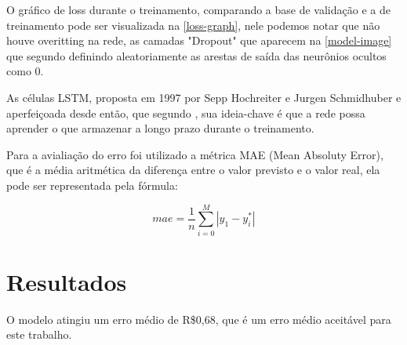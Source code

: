 \documentclass[
	article,			%
	11pt,				%
	oneside,			%
	a4paper,			%
	english,			%
	brazil,				%
	sumario=tradicional
	]{abntex2}
\begin{document}
O gráfico de loss durante o treinamento, comparando a base de validação e a de treinamento pode ser visualizada na \autoref{loss-graph}, nele podemos notar que não houve overitting na rede, as camadas "Dropout" que aparecem na \autoref{model-image} que segundo  definindo aleatoriamente as arestas de saída das neurônios ocultos como 0.

As células LSTM, proposta em 1997 por Sepp Hochreiter e Jurgen Schmidhuber e aperfeiçoada desde então, que segundo , sua ideia-chave é que a rede possa aprender o que armazenar a longo prazo durante o treinamento.

Para a avialiação do erro foi utilizado a métrica MAE (Mean Absoluty Error), que é a média aritmética da diferença entre o valor previsto e o valor real, ela pode ser representada pela fórmula:

\begin{equation}
mae = \frac{1}{n}\sum_{i=0}^M |{y_1 - y^*_i}|
\end{equation}

\section{Resultados}

O modelo atingiu um erro médio de R\$0,68, que é um erro médio aceitável para este trabalho.

\postextual



%
%

\end{document}
